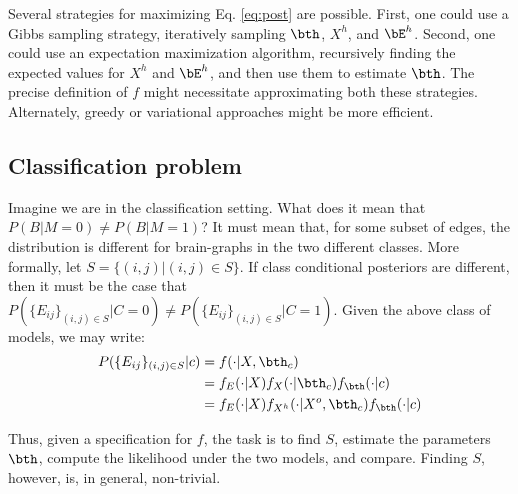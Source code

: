 Several strategies for maximizing Eq. \ref{eq:post} are possible. First, one could use a Gibbs sampling strategy, iteratively sampling $\bth$, $X^h$, and $\bE^h$. Second, one could use an expectation maximization algorithm, recursively finding the expected values for $X^h$ and $\bE^h$, and then use them to estimate $\bth$. The precise definition of $f$ might necessitate approximating both these strategies. Alternately, greedy or variational approaches might be more efficient.

\subsection{Classification problem} 

\label{sub:classification_problem}

Imagine we are in the classification setting. What does it mean that $P(B | M=0) \neq P(B | M=1)$? It must mean that, for some subset of edges, the distribution is different for brain-graphs in the two different classes. More formally, let $S=\{(i,j) | (i,j) \in S\}$. If class conditional posteriors are different, then it must be the case that $P(\{E_{ij}\}_{(i,j) \in S} | C=0) \neq P(\{E_{ij}\}_{(i,j) \in S} | C=1)$. Given the above class of models, we may write:
\begin{align}
	P(\{E_{ij}\}_{(i,j) \in S} | c) &= f(\cdot | X, \bth_c) \nonumber \\
	&= f_E(\cdot | X) f_X(\cdot | \bth_c) f_{\bth}(\cdot | c) \nonumber \\
	&= f_E(\cdot | X) f_{X^h}(\cdot | X^o, \bth_c) f_{\bth}(\cdot | c) 
\end{align}

Thus, given a specification for $f$, the task is to find $S$, estimate the parameters $\bth$, compute the likelihood under the two models, and compare. Finding $S$, however, is, in general, non-trivial.

